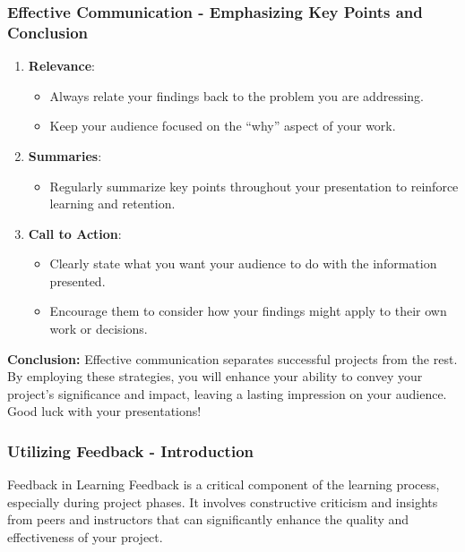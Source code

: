\documentclass[aspectratio=169]{beamer}
\begin{document}
\begin{frame}[fragile]
  \frametitle{Effective Communication - Emphasizing Key Points and Conclusion}
  \begin{enumerate}
    \item \textbf{Relevance}:
    \begin{itemize}
        \item Always relate your findings back to the problem you are addressing.
        \item Keep your audience focused on the “why” aspect of your work.
    \end{itemize}
    
    \item \textbf{Summaries}:
    \begin{itemize}
        \item Regularly summarize key points throughout your presentation to reinforce learning and retention.
    \end{itemize}
    
    \item \textbf{Call to Action}:
    \begin{itemize}
        \item Clearly state what you want your audience to do with the information presented.
        \item Encourage them to consider how your findings might apply to their own work or decisions.
    \end{itemize}
  \end{enumerate}
  
  \bigskip
  \textbf{Conclusion:} Effective communication separates successful projects from the rest. By employing these strategies, you will enhance your ability to convey your project's significance and impact, leaving a lasting impression on your audience. Good luck with your presentations!
\end{frame}

\begin{frame}[fragile]
    \frametitle{Utilizing Feedback - Introduction}
    \begin{block}{Feedback in Learning}
        Feedback is a critical component of the learning process, especially during project phases. 
        It involves constructive criticism and insights from peers and instructors that can significantly enhance the quality and effectiveness of your project.
    \end{block}
\end{frame}
\end{document}
